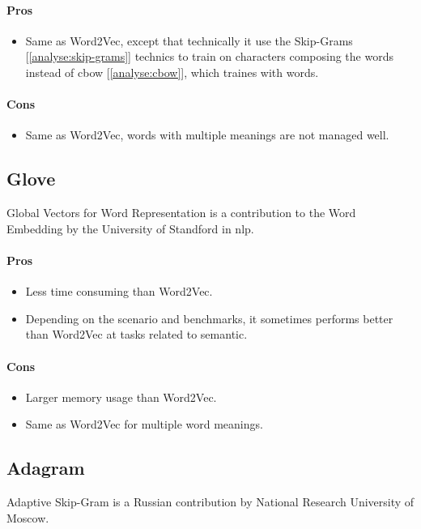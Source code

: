 \paragraph{Pros}
\begin{itemize}
    \setlength\itemsep{0em}
    \item Same as Word2Vec, except that technically it use the Skip-Grams [\ref{analyse:skip-grams}] technics to train on characters composing the words instead of \gls{cbow} [\ref{analyse:cbow}], which traines with words.
\end{itemize}
\paragraph{Cons}
\begin{itemize}
    \setlength\itemsep{0em}
    \item Same as Word2Vec, words with multiple meanings are not managed well.
\end{itemize}


\subsection{Glove\cite{article:glove}}
Global Vectors for Word Representation is a contribution to the Word Embedding by the University of Standford in \gls{nlp}.
\paragraph{Pros}
\begin{itemize}
    \setlength\itemsep{0em}
    \item Less time consuming than Word2Vec.
    \item Depending on the scenario and benchmarks, it sometimes performs better than Word2Vec at tasks related to semantic.
\end{itemize}
\paragraph{Cons}
\begin{itemize}
    \setlength\itemsep{0em}
    \item Larger memory usage than Word2Vec.
    \item Same as Word2Vec for multiple word meanings.
\end{itemize}


\subsection{Adagram\cite{article:adagram}}
\label{sec:adagram}
Adaptive Skip-Gram is a Russian contribution by National Research University of Moscow.
